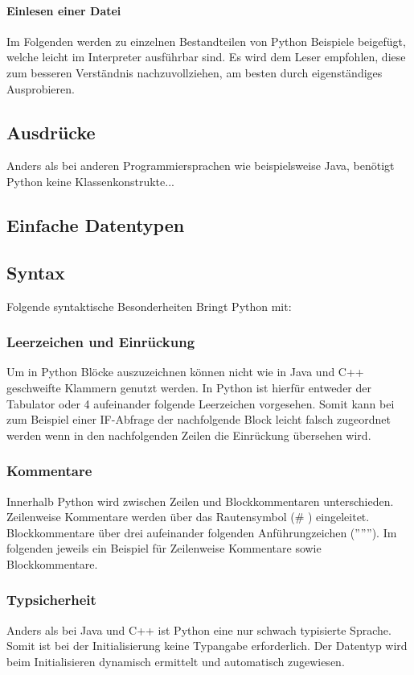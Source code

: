 \paragraph{Einlesen einer Datei}
Im Folgenden werden zu einzelnen Bestandteilen von Python Beispiele beigefügt, welche leicht im Interpreter ausführbar sind. Es wird dem Leser empfohlen, diese zum besseren Verständnis nachzuvollziehen, am besten durch eigenständiges Ausprobieren.

\subsection{Ausdrücke} %
Anders als bei anderen Programmiersprachen wie beispielsweise Java, benötigt Python keine Klassenkonstrukte... %
\subsection{Einfache Datentypen}




\subsection{Syntax}
Folgende syntaktische Besonderheiten Bringt Python mit:
\subsubsection{Leerzeichen und Einrückung}
Um in Python Blöcke auszuzeichnen können nicht wie in Java und C++ geschweifte Klammern genutzt werden. 
In Python ist hierfür entweder der Tabulator oder 4 aufeinander folgende Leerzeichen vorgesehen.
Somit kann bei zum Beispiel einer IF-Abfrage der nachfolgende Block leicht falsch zugeordnet werden wenn in den nachfolgenden Zeilen die Einrückung übersehen wird.
\subsubsection{Kommentare}
Innerhalb Python wird zwischen Zeilen und Blockkommentaren unterschieden.
Zeilenweise Kommentare werden über das Rautensymbol (\# ) eingeleitet.
Blockkommentare über drei aufeinander folgenden Anführungzeichen ('''''').
Im folgenden jeweils ein Beispiel für Zeilenweise Kommentare sowie Blockkommentare.

\subsubsection{Typsicherheit}
Anders als bei Java und C++ ist Python eine nur schwach typisierte Sprache.
Somit ist bei der Initialisierung keine Typangabe erforderlich. 
Der Datentyp wird beim Initialisieren dynamisch ermittelt und automatisch zugewiesen.
